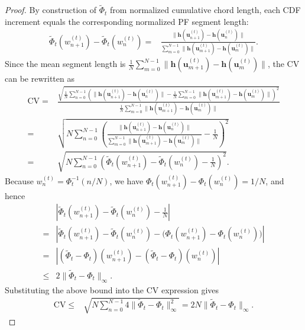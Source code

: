 \documentclass{article}
\newcommand{\bu}{\mathbf{u}}
\newcommand{\h}{\mathbf{h}}
\begin{document}
\begin{proof}
By construction of $\tilde\Phi_t$ from normalized cumulative chord length, each CDF increment equals the corresponding normalized PF segment length:
\begin{align}
\tilde\Phi_t(w_{n+1}^{(t)})-\tilde\Phi_t(w_n^{(t)})
=&\frac{\|\h(\bu_{n+1}^{(t)})-\h(\bu_n^{(t)})\|}
{\sum_{m=0}^{N-1}\|\h(\bu_{m+1}^{(t)})-\h(\bu_m^{(t)})\|}.
\end{align}
Since the mean segment length is $\frac1N\sum_{m=0}^{N-1}\|\h(\bu_{m+1}^{(t)})-\h(\bu_m^{(t)})\|$, the CV can be rewritten as
\begin{align}
\mathrm{CV}
=&\frac{\sqrt{\frac1N\sum_{n=0}^{N-1}\left(\|\h(\bu_{n+1}^{(t)})-\h(\bu_n^{(t)})\|-\frac1N\sum_{m=0}^{N-1}\|\h(\bu_{m+1}^{(t)})-\h(\bu_m^{(t)})\|\right)^2}}
{\frac1N\sum_{m=0}^{N-1}\|\h(\bu_{m+1}^{(t)})-\h(\bu_m^{(t)})\|} \nonumber\\
=&\sqrt{N\sum_{n=0}^{N-1}\left(\frac{\|\h(\bu_{n+1}^{(t)})-\h(\bu_n^{(t)})\|}
{\sum_{m=0}^{N-1}\|\h(\bu_{m+1}^{(t)})-\h(\bu_m^{(t)})\|}-\frac1N\right)^2} \nonumber\\
=&\sqrt{N\sum_{n=0}^{N-1}\left(\tilde\Phi_t(w_{n+1}^{(t)})-\tilde\Phi_t(w_n^{(t)})-\frac1N\right)^2}.
\end{align}
Because $w_n^{(t)}=\Phi_t^{-1}(n/N)$, we have $\Phi_t(w_{n+1}^{(t)})-\Phi_t(w_n^{(t)})=1/N$, and hence
\begin{align}
&\left|\tilde\Phi_t(w_{n+1}^{(t)})-\tilde\Phi_t(w_n^{(t)})-\frac1N\right| \nonumber\\
=&\left|\tilde\Phi_t(w_{n+1}^{(t)})-\tilde\Phi_t(w_n^{(t)})-\big(\Phi_t(w_{n+1}^{(t)})-\Phi_t(w_n^{(t)})\big)\right| \nonumber\\
=&\left|(\tilde\Phi_t-\Phi_t)(w_{n+1}^{(t)})-(\tilde\Phi_t-\Phi_t)(w_n^{(t)})\right| \nonumber\\
\leq&2\|\tilde\Phi_t-\Phi_t\|_\infty .
\end{align}
Substituting the above bound into the CV expression gives
\begin{align}
\mathrm{CV}
\leq&\sqrt{N\sum_{n=0}^{N-1}4\|\tilde\Phi_t-\Phi_t\|_\infty^2}
=2N\|\tilde\Phi_t-\Phi_t\|_\infty .
\end{align}


\end{proof}
\end{document}
